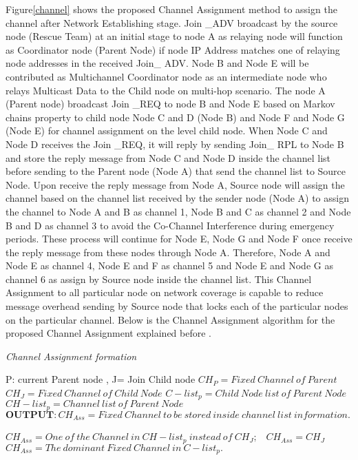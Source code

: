 \documentclass{article}
\begin{document}
Figure\ref{channel} shows the proposed Channel Assignment method to assign the channel after Network Establishing stage. Join _ADV broadcast by the source node (Rescue Team) at an initial stage to node A as relaying node will function as Coordinator node (Parent Node) if node IP Address matches one of relaying node addresses in the received Join_ ADV. Node B and Node E will be contributed as Multichannel Coordinator node as an intermediate node who relays Multicast Data to the Child node on multi-hop scenario. The node A (Parent node) broadcast Join _REQ to node B and Node E based on Markov chains property to child node Node C and D (Node B) and Node F and Node G (Node E) for channel assignment on the level child node. When Node C and Node D receives the Join _REQ, it will reply by sending Join_ RPL to Node B and store the reply message from Node C and Node D inside the channel list before sending to the Parent node (Node A) that send the channel list to Source Node. Upon receive the reply message from Node A, Source node will assign the channel based on the channel list received by the sender node (Node A) to assign the channel to Node A and B as channel 1, Node B and C as channel 2 and Node B and D as channel 3 to avoid the Co-Channel Interference during emergency periods. These process will continue for Node E, Node G and Node F once receive the reply message from these nodes through Node A. Therefore, Node A and Node E as channel 4, Node E and F as channel 5 and Node E and Node G as channel 6 as assign  by Source node inside the channel list. This Channel Assignment to all particular node on network coverage is capable to reduce message overhead sending by Source node that locks each of the particular nodes on the particular channel. Below is the Channel Assignment algorithm for the proposed Channel Assignment explained before .

\begin{algorithm}
\caption{\emph{Channel Assignment formation}}
\label{algo:second}
\begin{algorithmic}
\Require P: current Parent node , J= Join Child node
\Ensure $ CH_{P} = Fixed ~Channel ~of~ Parent$
\Ensure $ CH_{J}  = Fixed ~Channel ~of ~Child ~Node$
\Ensure $ C-list_{p} = Child ~Node ~list ~of ~Parent ~Node$
\Ensure $ CH-list_{p}  = Channel ~list~ of ~Parent ~Node$\\

\State $ \textbf{OUTPUT} : CH_{Ass} = Fixed ~Channel~ to~ be~ stored~ inside~ channel ~list~ information.$

	 {
		\State $ CH_{Ass} = One ~of~ the~ Channel~ in ~CH-list_{p} ~instead ~of~ CH_{J};$
		\Else ~$ CH_{Ass} = CH_{J}$
		\EndIf}
		\Else ~$ CH_{Ass} = The ~dominant ~Fixed ~Channel~ in~ C-list_{p}.$
	\EndIf
\end{algorithmic}
\end{algorithm}
\end{document}
